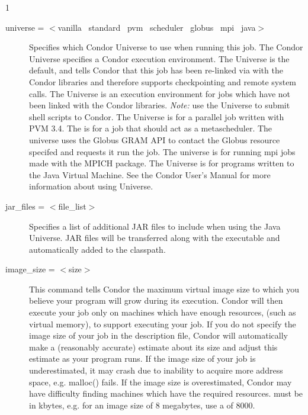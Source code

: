 \begin{ManPage}{\label{man-condor-submit}}{1}
\begin{description}

\item[universe = $<$vanilla \Bar\ standard \Bar\ pvm \Bar\ scheduler
\Bar\ globus \Bar\ mpi \Bar\ java$>$] 
Specifies which Condor Universe to use when running this job.  The Condor 
Universe specifies a Condor execution environment.  The  
Universe is the default, and tells Condor that this job has been re-linked 
via  with the Condor libraries and therefore supports
checkpointing and remote system calls.  The  Universe is an
execution environment for jobs which have not been linked with the
Condor libraries.  \textit{Note:} use the  Universe to
submit shell scripts to Condor.  The  Universe is for a
parallel job written with PVM 3.4. The  is for a job that
should act as a metascheduler.
The  universe uses the Globus
GRAM API to contact the Globus resource specifed and requests it run the job.
The  universe is
for running mpi jobs made with the MPICH package.
The  Universe is for programs written to the Java Virtual Machine.
See the Condor User's Manual for more information about using Universe.


\item[jar\_files = $<$file\_list$>$]
Specifies a list of additional JAR files to include when using
the Java Universe.  JAR files will be transferred along with
the executable and automatically added to the classpath.


\item[image\_size = $<$size$>$] This command tells Condor the maximum
virtual image size to which you believe your program will grow during
its execution. Condor will then execute your job only on machines which
have enough resources, (such as virtual memory), to support executing
your job. If you do not specify the image size of your job in the
description file, Condor will automatically make a (reasonably accurate)
estimate about its size and adjust this estimate as your program runs.
If the image size of your job is underestimated, it may crash due to
inability to acquire more address space, e.g. malloc() fails. If the image
size is overestimated, Condor may have difficulty finding machines which
have the required resources.  must be in kbytes, e.g. for
an image size of 8 megabytes, use a  of 8000.


\end{description}
\end{ManPage}
